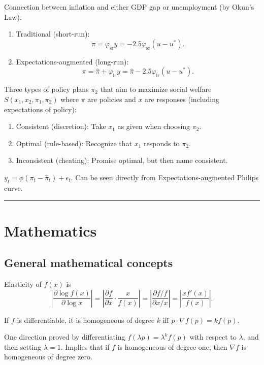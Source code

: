 \documentclass[8pt,letterpaper, landscape]{extarticle} %
\renewcommand{\ln}{\log}
\begin{document}
\begin{multicols}{3}
\begin{description}
 Connection between inflation and either GDP gap or unemployment (by Okun's Law).
\begin{enumerate}
\item Traditional (short-run):
$$ \pi = \varphi_{\text{sr}} y = -2.5 \varphi_{\text{sr}} (u - u^*) . $$
\item Expectations-augmented (long-run):
$$ \pi = \hat{\pi} + \varphi_{\text{lr}} y = \hat{\pi} - 2.5 \varphi_{\text{lr}} (u - u^*) . $$
\end{enumerate}

 Three types of policy plans $ \pi_2 $ that aim to maximize social welfare $ S (x_1, x_2, \pi_1 , \pi_2 ) $ where $ \pi $  are policies and $ x $ are responses (including expectations of policy):
\begin{enumerate}
\item Consistent (discretion): Take $ x_1 $ as given when choosing $ \pi_2 $.
\item Optimal (rule-based): Recognize that $ x_1 $ responds to $ \pi_2 $.
\item Inconsistent (cheating): Promise optimal, but then name consistent.
\end{enumerate}

 $ y_t = \phi (\pi_t - \hat{\pi}_t) + \epsilon_t  $. Can be seen directly from Expectations-augmented Philips curve.

\hrule
\section{Mathematics}
\subsection{General mathematical concepts}
 Elasticity of $ f(x) $ is
$$ \left| \dfrac{\partial \ln f(x)}{\partial \ln x} \right| = \left| \frac{\partial f}{\partial x} \cdot \frac{x}{f(x)} \right| = \left| \frac{\partial f / f}{\partial x / x} \right| = \left| \frac{x f'(x)}{f(x)} \right| .$$

 If $ f $ is differentiable, it is homogeneous of degree $ k $ iff $ p \cdot \nabla f(p) = k f(p) $.

One direction proved by differentiating $ f(\lambda p) = \lambda^k f(p) $ with respect to $ \lambda $, and then setting $ \lambda = 1 $. Implies that if $ f $ is homogeneous of degree one, then $ \nabla f $ is homogeneous of degree zero.


\end{description}
\end{multicols}
\end{document}

